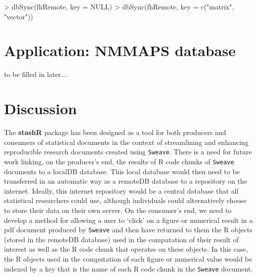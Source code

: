 \documentclass{article}
\newcommand{\pkg}{\textbf}
\newcommand{\code}{\texttt}
\begin{document}
\begin{Schunk}
\begin{Sinput}
> dbSync(fhRemote, key = NULL)
> dbSync(fhRemote, key = c("matrix", "vector"))
\end{Sinput}
\end{Schunk}


\section{Application: NMMAPS database} 

to be filled in later...
 
\section{Discussion}

The \pkg{stashR} package has been designed as a
tool for both producers and consumers of statistical documents in
the context of streamlining and enhancing reproducible research
documents created using \code{Sweave}. There is a need for future 
work linking, on the producer's end, the results of R code chunks 
of \code{Sweave} documents to a localDB database. This local 
database would then need to be transferred in an automatic way as a
remoteDB database to a repository on the internet. Ideally,
this internet repository would be a central database that all
statistical researchers could use, although individuals could 
alternatively choose to store their data on their own server. On the
consumer's end, we need to develop a method for allowing a user to
`click' on a figure or numerical result in a pdf document produced
by \code{Sweave} and then have returned to them the R objects
(stored in the remoteDB database) used in the computation of
their result of interest as well as the R code chunk that operates
on these objects. In this case, the R objects used in the
computation of each figure or numerical value would be indexed by
a key that is the name of each R code chunk in the \code{Sweave}
document.






\end{document}
